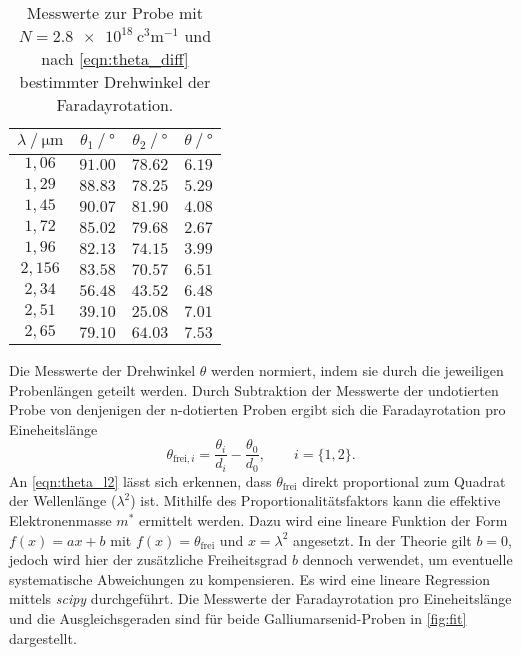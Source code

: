 \begin{table}
  \centering
  \caption{Messwerte zur Probe mit $N = \qty{2.8e18}{\cubic\centi\metre^{-1}}$ und nach \autoref{eqn:theta_diff} bestimmter Drehwinkel der Faradayrotation.}
  \label{tab:mw3}
  \begin{tabular}{c c c c}
    \toprule
    $\lambda \mathbin{/} \unit{\micro\meter}$ & $\theta_{1} \mathbin{/} \unit{\degree}$ & $\theta_{2} \mathbin{/} \unit{\degree}$ &%
     $\theta \mathbin{/} \unit{\degree}$ \\
    \midrule
    $1,06 $ & $91.00$ & $78.62$ & $6.19$ \\
    $1,29 $ & $88.83$ & $78.25$ & $5.29$ \\
    $1,45 $ & $90.07$ & $81.90$ & $4.08$ \\
    $1,72 $ & $85.02$ & $79.68$ & $2.67$ \\
    $1,96 $ & $82.13$ & $74.15$ & $3.99$ \\
    $2,156$ & $83.58$ & $70.57$ & $6.51$ \\
    $2,34 $ & $56.48$ & $43.52$ & $6.48$ \\
    $2,51 $ & $39.10$ & $25.08$ & $7.01$ \\
    $2,65 $ & $79.10$ & $64.03$ & $7.53$ \\
    \bottomrule
  \end{tabular}
\end{table}

Die Messwerte der Drehwinkel $\theta$ werden normiert, indem sie durch die jeweiligen Probenlängen geteilt werden. Durch Subtraktion der Messwerte der undotierten Probe von 
denjenigen der n-dotierten Proben ergibt sich die Faradayrotation pro Eineheitslänge 
\begin{equation*}
  \theta_{\text{frei}, i} = \frac{\theta_i}{d_i} - \frac{\theta_0}{d_0}, \qquad i = \{1, 2\}.
\end{equation*}
An \autoref{eqn:theta_l2} lässt sich erkennen, dass $\theta_\text{frei}$ direkt proportional zum Quadrat der Wellenlänge ($\lambda^2$) ist. Mithilfe des Proportionalitätsfaktors 
kann die effektive Elektronenmasse $m^*$ ermittelt werden. Dazu wird eine lineare Funktion der Form $f(x) = ax + b$ mit $f(x) = \theta_\text{frei}$ und $x = \lambda^2$
angesetzt. In der Theorie gilt $b = 0$, jedoch wird hier der zusätzliche Freiheitsgrad $b$ dennoch verwendet, um eventuelle systematische Abweichungen zu kompensieren.
Es wird eine lineare Regression mittels \textit{scipy} \cite{scipy} durchgeführt. Die Messwerte der Faradayrotation pro Eineheitslänge und die Ausgleichsgeraden sind für 
beide Galliumarsenid-Proben in \autoref{fig:fit} dargestellt.

